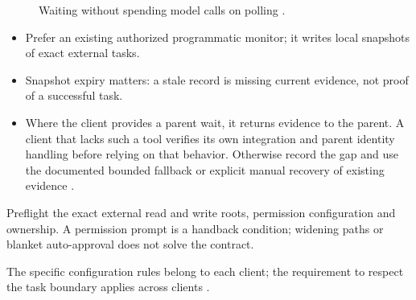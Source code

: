 \begin{figure}[H]
  \centering
  \caption{Waiting without spending model calls on polling \cite[Monitor selection;
      Programmatic job monitors]{skill:jobs}.}
  \label{fig:remote-wait}
\end{figure}

\begin{itemize}
  \item Prefer an existing authorized programmatic monitor; it writes local snapshots of exact
        external tasks.
  \item Snapshot expiry matters: a stale record is missing current evidence, not proof of a
        successful task.
  \item Where the client provides a parent wait, it returns evidence to the parent. A client that
        lacks such a tool verifies its own integration and parent identity handling before
        relying on that behavior. Otherwise record the gap and use the documented bounded
        fallback or explicit manual recovery of existing evidence \cite[Client scope; Parent wait
          contract]{skill:jobs}.
\end{itemize}

\begin{rulebox}
  Preflight the exact external read and write roots, permission configuration and ownership.
  A permission prompt is a handback condition; widening paths or blanket auto-approval does
  not solve the contract.
\end{rulebox}

The specific configuration rules belong to each client; the requirement to respect the
task boundary applies across clients \cite[Permission and access preflight; Client
  scope]{skill:jobs}.

